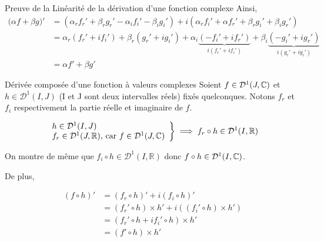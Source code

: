 \documentclass{article}
\renewenvironment{question_kholle}[2][ ]
{
	\subsection{\texorpdfstring{#2}{}}
	\notblank{#1}
	{
		\noindent #1
		\bigbreak
	}
	{}
	\begin{proof}
}
{
	\end{proof}
}
\begin{document}
\begin{question_kholle}{Preuve de la Linéarité de la dérivation d'une fonction complexe}
	Ainsi,
	\begin{align*}
		\big( \alpha f + \beta g \big)' & = (\alpha_r f_r' + \beta_r g_r' - \alpha_i f_i' - \beta_i g_i') + i (\alpha_r f_i' +\alpha f_r' +\beta_r g_i' +\beta_i g_r')                                         \\
		                                & = \alpha_r(f_r' + if_i') + \beta_r(g_r' + ig_i') + \alpha_i \underbrace{(-f_i' + if_r')}_{i(f_r' + if_i')} + \beta_i \underbrace{( -g_i' + ig_r')}_{i(g_r' + ig_i')} \\
		                                & =\alpha f' + \beta g'
	\end{align*}
\end{question_kholle}

\begin{question_kholle}{Dérivée composée d'une fonction à valeurs complexes}
	Soient $f \in \mathcal D ^1(J, \mathbb C) $ et $h \in \mathcal D^1(I, J)$ (I et J sont deux intervalles réels) fixés quelconques. Notons $f_r$ et $f_i$ respectivement la partie réelle et imaginaire de $f$.

	\begin{align*}
		\left .
		\begin{array}{ll}
			h \in \mathcal D^1(I, J) \\
			f_r \in \mathcal D^1(J, \mathbb R) \text{, car } f \in \mathcal D^1(J, \mathbb C)
		\end{array}
		\right \}
		\implies f_r \circ h \in \mathcal D^1(I, \mathbb R)
	\end{align*}

	On montre de même que $f_i \circ h \in \mathcal D^1(I, \mathbb  R)$ donc $f \circ h \in \mathcal D^1(I, \mathbb C)$.

	De plus,

	\begin{align*}
		(f \circ h)' & = (f_r \circ h)' + i (f_i \circ h)'                       \\
		             & = (f_r' \circ h ) \times h' + i((f_i' \circ h) \times h') \\
		             & =(f_r' \circ h + if_i' \circ h) \times h'                 \\
		             & = (f' \circ h) \times h'
	\end{align*}
\end{question_kholle}
\end{document}
